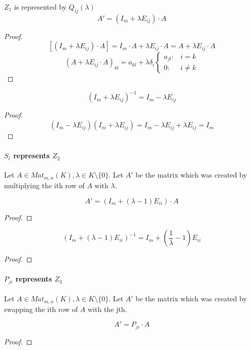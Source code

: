 \begin{proposition}[\(Q_{ij}\) = \(Z_1\)]
   \(Z_1\) is represented by \(Q_{ij}(\lambda)\)
   \[A' = (I_m + \lambda E_{ij}) \cdot A\]
\end{proposition}
\begin{proof}
   \[[(I_m + \lambda E_{ij}) \cdot A] = I_m \cdot A + \lambda E_{ij} \cdot A = A + \lambda E_{ij} \cdot A\]
   \[(A + \lambda E_{ij} \cdot A)_{kl} = a_{kl} + \lambda \delta_i \begin{cases}a_{jl}: & i=k\\ 0: & i \neq k\end{cases}\]
\end{proof}

\begin{proposition}
   \[(I_m + \lambda E_{ij})^{-1} = I_m - \lambda E_{ij}\]
\end{proposition}
\begin{proof}
   \[(I_m - \lambda E_{ij})(I_m + \lambda E_{ij}) = I_m - \lambda E_{ij} + \lambda E_{ij} = I_m\]
\end{proof}

\paragraph{\(S_i\) represents \(Z_2\)}
Let \(A \in Mat_{m,n}(K), \lambda \in K \setminus \{0\}\).
Let \(A'\) be the matrix which was created by multiplying the ith row of \(A\) with \(\lambda\).

\begin{proposition}[\(S_i(\lambda)\) = \(Z_2\)]
   \[A' = (I_m + (\lambda - 1) E_{ii}) \cdot A\]
\end{proposition}
\begin{proof}
\end{proof}

\begin{proposition}
   \[(I_m + (\lambda - 1) E_{ii})^{-1} = I_m + \left(\frac{1}{\lambda} - 1\right) E_{ii}\]
\end{proposition}
\begin{proof}
\end{proof}

\paragraph{\(P_{ji}\) represents \(Z_3\)}
Let \(A \in Mat_{m,n}(K), \lambda \in K \setminus \{0\}\).
Let \(A'\) be the matrix which was created by swapping the ith row of \(A\) with the jth.
\begin{proposition}[\(P_{ji}\) = \(Z_3\)]
   \[A' = P_{ji} \cdot A\]
\end{proposition}
\begin{proof}
\end{proof}

